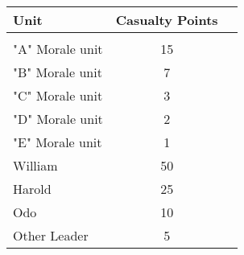 \begin{center}
  \begin{tabular}{ l cc }
    \textbf{Unit} & \textbf{Casualty Points} \\
    \hline \\ [-2.0ex]
    "A" Morale unit & 15 \\
    "B" Morale unit & 7 \\
    "C" Morale unit & 3 \\
    "D" Morale unit & 2 \\
    "E" Morale unit & 1 \\
    William & 50 \\
    Harold & 25 \\
    Odo & 10 \\
    Other Leader & 5
  \end{tabular}
\end{center}
